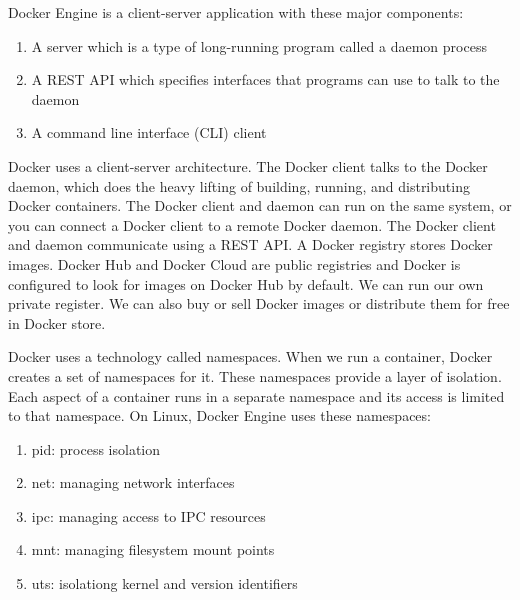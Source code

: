 \begin{itemize}
Docker Engine is a client-server application with these major components:
\begin{enumerate}
\item A server which is a type of long-running program called a daemon process
\item A REST API which specifies interfaces that programs can use to talk to the daemon
\item A command line interface (CLI) client
\end{enumerate}
Docker uses a client-server architecture. The Docker client talks to the Docker daemon, which does the heavy lifting of building, running, and distributing Docker containers. The Docker client and daemon can run on the same system, or you can connect a Docker client to a remote Docker daemon. The Docker client and daemon communicate using a REST API.
A Docker registry stores Docker images. Docker Hub and Docker Cloud are public registries and Docker is configured to look for images on Docker Hub by default. We can run our own private register. We can also buy or sell Docker images or distribute them for free in Docker store.

Docker uses a technology called namespaces. When we run a container, Docker creates a set of namespaces for it. These namespaces provide a layer of isolation. Each aspect of a container runs in a separate namespace and its access is limited to that namespace.
On Linux, Docker Engine uses these namespaces:
\begin{enumerate}
\item pid: process isolation
\item net: managing network interfaces
\item ipc: managing access to IPC resources
\item mnt: managing filesystem mount points
\item uts: isolationg kernel and version identifiers
\end{enumerate}



\end{itemize}
